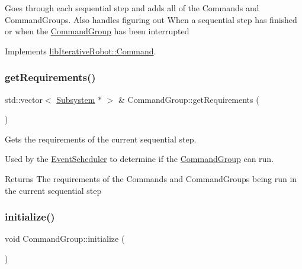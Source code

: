 Goes through each sequential step and adds all of the Commands and Command\+Groups. Also handles figuring out When a sequential step has finished or when the \mbox{\hyperlink{classlib_iterative_robot_1_1_command_group}{Command\+Group}} has been interrupted 

Implements \mbox{\hyperlink{classlib_iterative_robot_1_1_command_a4b38164af1a8645fae2fdae296317cf4}{lib\+Iterative\+Robot\+::\+Command}}.

\mbox{\label{classlib_iterative_robot_1_1_command_group_abf3d539920648f9dec9dfdef30699c82}} 
\subsubsection{\texorpdfstring{getRequirements()}{getRequirements()}}
{\footnotesize\ttfamily std\+::vector$<$ \mbox{\hyperlink{classlib_iterative_robot_1_1_subsystem}{Subsystem}} $\ast$ $>$ \& Command\+Group\+::get\+Requirements (\begin{DoxyParamCaption}{ }\end{DoxyParamCaption})}



Gets the requirements of the current sequential step. 

Used by the \mbox{\hyperlink{classlib_iterative_robot_1_1_event_scheduler}{Event\+Scheduler}} to determine if the \mbox{\hyperlink{classlib_iterative_robot_1_1_command_group}{Command\+Group}} can run. \begin{DoxyReturn}{Returns}
The requirements of the Commands and Command\+Groups being run in the current sequential step 
\end{DoxyReturn}
\mbox{\label{classlib_iterative_robot_1_1_command_group_a99800c5dbd05ab750aa0bb27518d0467}} 
\subsubsection{\texorpdfstring{initialize()}{initialize()}}
{\footnotesize\ttfamily void Command\+Group\+::initialize (\begin{DoxyParamCaption}{ }\end{DoxyParamCaption})\hspace{0.3cm}{\ttfamily [virtual]}}



